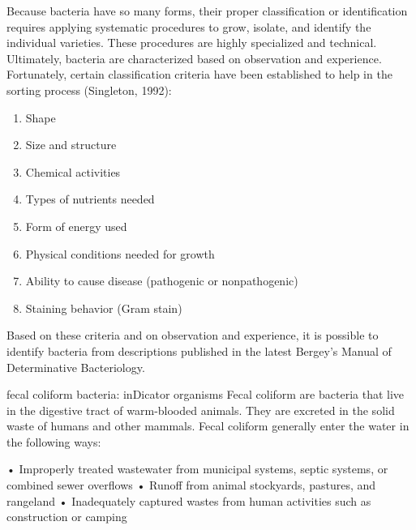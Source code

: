 \documentclass{article}
\begin{document}
Because bacteria have so many forms, their proper classification or
identification requires applying systematic procedures to grow, isolate,
and identify the individual varieties. These procedures are highly
specialized and technical. Ultimately, bacteria are characterized based
on observation and experience. Fortunately, certain classification
criteria have been established to help in the sorting process
(Singleton, 1992):

\begin{enumerate}
\def\labelenumi{\arabic{enumi}.}
\tightlist
\item
  Shape
\item
  Size and structure
\item
  Chemical activities
\item
  Types of nutrients needed
\item
  Form of energy used
\item
  Physical conditions needed for growth
\item
  Ability to cause disease (pathogenic or nonpathogenic)
\item
  Staining behavior (Gram stain)
\end{enumerate}

Based on these criteria and on observation and experience, it is
possible to identify bacteria from descriptions published in the latest
Bergey's Manual of Determinative Bacteriology.

fecal coliform bacteria: inDicator organisms Fecal coliform are bacteria
that live in the digestive tract of warm-blooded animals. They are
excreted in the solid waste of humans and other mammals. Fecal coliform
generally enter the water in the following ways:

• Improperly treated wastewater from municipal systems, septic systems,
or combined sewer overflows • Runoff from animal stockyards, pastures,
and rangeland • Inadequately captured wastes from human activities such
as construction or camping
\end{document}
